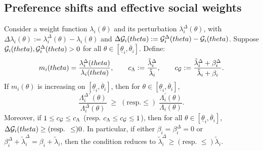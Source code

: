 \documentclass[master.tex]{subfiles}
\begin{document}
\subsection{Preference shifts and effective social weights}

\begin{lemma}\label{lem:preferenceorder}
Consider a weight function $\lambda_i(\theta)$ and its perturbation $\lambda_i^\Delta(\theta)$, with $\Delta\lambda_i(\theta):=\lambda_i^\Delta(\theta)-\lambda_i(\theta)$ and $\Delta\mathcal{G}_i(theta):=\mathcal{G}_i^\Delta(theta)-\mathcal{G}_i(theta)$. Suppose $\mathcal{G}_i(theta),\mathcal{G}_i^\Delta(theta)>0$ for all $\theta\in[\underline{\theta}_i,\overline{\theta}_i]$. Define:
\[
m_i(theta) = \frac{\lambda_i^\Delta(theta)}{\lambda_i(theta)}, \qquad c_\Lambda:=\frac{\tilde\lambda_i^\Delta}{\tilde\lambda_i},
\qquad
c_{\mathcal{G}}:=\frac{\tilde\lambda_i^\Delta+\beta_i^\Delta}
{\tilde\lambda_i+\beta_i}.
\]
If $m_i(\theta)$ is increasing on $[\underline{\theta}_i,\overline{\theta}_i]$, then for $\theta\in[\underline{\theta}_i,\overline{\theta}_i]$,
\[
\frac{\Lambda_i^{\Delta\,\prime}(\theta)}{\Lambda_i^\Delta(\theta)} \;\ge\; (\text{resp.} \le) \; \frac{\Lambda_i^{\prime}(\theta)}{\Lambda_i(\theta)}.
\]
Moreover, if $1\le c_{\mathcal{G}}\le c_\Lambda$ (resp. $c_\Lambda\le c_{\mathcal{G}}\le 1$), then for all $\theta\in[\underline{\theta}_i,\overline{\theta}_i]$, $\Delta\mathcal{G}_i(theta)\ge(\text{resp. }\le)0$. In particular, if either $\beta_i=\beta_i^\Delta=0$ or $\beta_i^\Delta+\tilde\lambda_i^\Delta=\beta_i+\tilde\lambda_i$, then the condition reduces to $\tilde\lambda_i^\Delta\ge (\text{resp. }\le)\tilde\lambda_i$.
\end{lemma}
\end{document}
